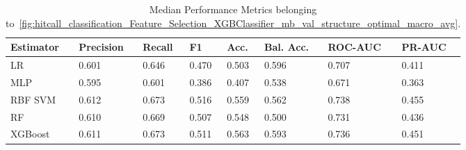 \begin{longtable}{llllllll}
\caption{Median Performance Metrics belonging to~\ref{fig:hitcall_classification_Feature_Selection_XGBClassifier_mb_val_structure_optimal_macro_avg}.}\label{tab:table:hitcall_classification_feature_selection_xgbclassifier_mb_val_structure_optimal_macro_avg}\\
\toprule
\midrule
\small Estimator & \small Precision & \small Recall & \small F1 & \small Acc. & \small Bal. Acc. & \small ROC-AUC & \small PR-AUC\\
\hline
LR & 0.601 & 0.646 & 0.470 & 0.503 & 0.596 & 0.707 & 0.411\\
MLP & 0.595 & 0.601 & 0.386 & 0.407 & 0.538 & 0.671 & 0.363\\
RBF SVM & 0.612 & 0.673 & 0.516 & 0.559 & 0.562 & 0.738 & 0.455\\
RF & 0.610 & 0.669 & 0.507 & 0.548 & 0.500 & 0.731 & 0.436\\
XGBoost & 0.611 & 0.673 & 0.511 & 0.563 & 0.593 & 0.736 & 0.451\\
\bottomrule
\end{longtable}
